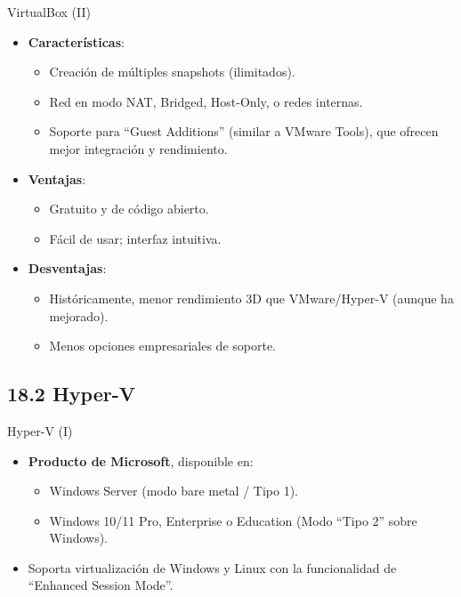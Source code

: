 \documentclass{beamer}
\begin{document}
\begin{frame}{VirtualBox (II)}
	\begin{itemize}
		\item \textbf{Características}:
			\begin{itemize}
				\item Creación de múltiples snapshots (ilimitados).
				\item Red en modo NAT, Bridged, Host-Only, o redes internas.
				\item Soporte para “Guest Additions” (similar a VMware Tools), que ofrecen mejor integración y rendimiento.
			\end{itemize}
		\item \textbf{Ventajas}:
			\begin{itemize}
				\item Gratuito y de código abierto.
				\item Fácil de usar; interfaz intuitiva.
			\end{itemize}
		\item \textbf{Desventajas}:
			\begin{itemize}
				\item Históricamente, menor rendimiento 3D que VMware/Hyper-V (aunque ha mejorado).
				\item Menos opciones empresariales de soporte.
			\end{itemize}
	\end{itemize}
\end{frame}

\subsection{18.2 Hyper-V}
\begin{frame}{Hyper-V (I)}
	\begin{itemize}
		\item \textbf{Producto de Microsoft}, disponible en:
			\begin{itemize}
				\item Windows Server (modo bare metal / Tipo 1).
				\item Windows 10/11 Pro, Enterprise o Education (Modo “Tipo 2” sobre Windows).
			\end{itemize}
		\item Soporta virtualización de Windows y Linux con la funcionalidad de “Enhanced Session Mode”.
	\end{itemize}
\end{frame}
\end{document}
